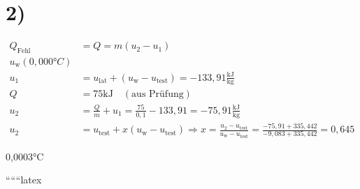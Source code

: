 \section*{2)}

\begin{align*}
Q_{\text{Fehl}} &= Q = m (u_2 - u_1) \\
u_{\text{w}}(0,000°C) \\
u_1 &= u_{\text{lat}} + (u_{\text{w}} - u_{\text{test}}) = -133,91 \frac{\text{kJ}}{\text{kg}} \\
Q &= 75 \text{kJ} \quad (\text{aus Prüfung}) \\
u_2 &= \frac{Q}{m} + u_1 = \frac{75}{0,1} - 133,91 = -75,91 \frac{\text{kJ}}{\text{kg}} \\
u_2 &= u_{\text{test}} + x (u_{\text{w}} - u_{\text{test}}) \Rightarrow x = \frac{u_2 - u_{\text{test}}}{u_{\text{w}} - u_{\text{test}}} = \frac{-75,91 + 335,442}{-9,083 + 335,442} = 0,645
\end{align*}

0,0003°C

``````latex


